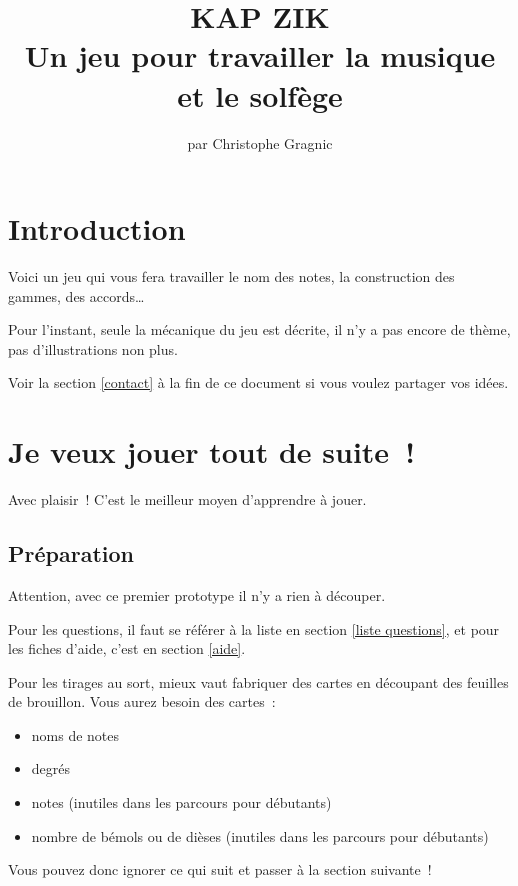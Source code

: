 \documentclass[11pt]{article}
\title{\vspace{-5em}
KAP ZIK \\
\vspace{1em}
Un jeu pour travailler la musique et le solfège}
\author{par Christophe Gragnic}
\date{}
\begin{document}
\maketitle

\setcounter{tocdepth}{2}
\tableofcontents

\section{Introduction}

Voici un jeu qui vous fera travailler le nom des notes, la construction des
gammes, des accords…

Pour l’instant, seule la mécanique du jeu est décrite, il n’y a pas encore de
thème, pas d’illustrations non plus.

Voir la section \ref{contact} à la fin de ce document si vous voulez partager
vos idées.

\section{Je veux jouer tout de suite !}

Avec plaisir ! C’est le meilleur moyen d’apprendre à jouer.

\subsection{Préparation}

Attention, avec ce premier prototype il n’y a rien à découper.

Pour les questions, il faut se référer à la liste en section
\ref{liste questions}, et pour les fiches d’aide, c’est en section
\ref{aide}.

Pour les tirages au sort, mieux vaut fabriquer des cartes en découpant des
feuilles de brouillon. Vous aurez besoin des cartes :

\begin{itemize}
\item noms de notes
\item degrés
\item notes (inutiles dans les parcours pour débutants)
\item nombre de bémols ou de dièses (inutiles dans les parcours pour débutants)
\end{itemize}

Vous pouvez donc ignorer ce qui suit et passer à la section suivante !
\end{document}
